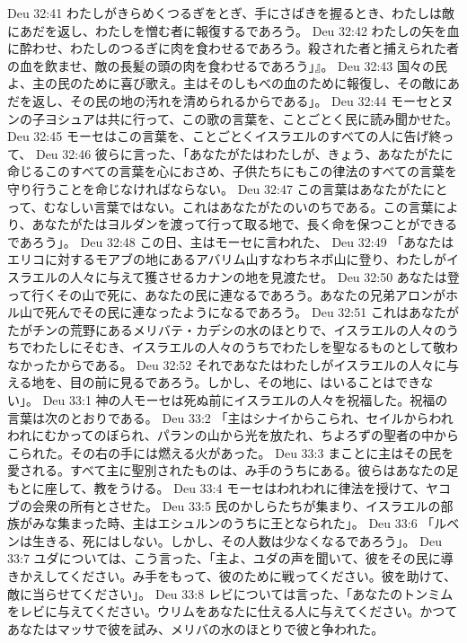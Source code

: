 Deu 32:41  わたしがきらめくつるぎをとぎ、手にさばきを握るとき、わたしは敵にあだを返し、わたしを憎む者に報復するであろう。
Deu 32:42  わたしの矢を血に酔わせ、わたしのつるぎに肉を食わせるであろう。殺された者と捕えられた者の血を飲ませ、敵の長髪の頭の肉を食わせるであろう」』。
Deu 32:43  国々の民よ、主の民のために喜び歌え。主はそのしもべの血のために報復し、その敵にあだを返し、その民の地の汚れを清められるからである」。
Deu 32:44  モーセとヌンの子ヨシュアは共に行って、この歌の言葉を、ことごとく民に読み聞かせた。
Deu 32:45  モーセはこの言葉を、ことごとくイスラエルのすべての人に告げ終って、
Deu 32:46  彼らに言った、「あなたがたはわたしが、きょう、あなたがたに命じるこのすべての言葉を心におさめ、子供たちにもこの律法のすべての言葉を守り行うことを命じなければならない。
Deu 32:47  この言葉はあなたがたにとって、むなしい言葉ではない。これはあなたがたのいのちである。この言葉により、あなたがたはヨルダンを渡って行って取る地で、長く命を保つことができるであろう」。
Deu 32:48  この日、主はモーセに言われた、
Deu 32:49  「あなたはエリコに対するモアブの地にあるアバリム山すなわちネボ山に登り、わたしがイスラエルの人々に与えて獲させるカナンの地を見渡たせ。
Deu 32:50  あなたは登って行くその山で死に、あなたの民に連なるであろう。あなたの兄弟アロンがホル山で死んでその民に連なったようになるであろう。
Deu 32:51  これはあなたがたがチンの荒野にあるメリバテ・カデシの水のほとりで、イスラエルの人々のうちでわたしにそむき、イスラエルの人々のうちでわたしを聖なるものとして敬わなかったからである。
Deu 32:52  それであなたはわたしがイスラエルの人々に与える地を、目の前に見るであろう。しかし、その地に、はいることはできない」。
Deu 33:1  神の人モーセは死ぬ前にイスラエルの人々を祝福した。祝福の言葉は次のとおりである。
Deu 33:2  「主はシナイからこられ、セイルからわれわれにむかってのぼられ、パランの山から光を放たれ、ちよろずの聖者の中からこられた。その右の手には燃える火があった。
Deu 33:3  まことに主はその民を愛される。すべて主に聖別されたものは、み手のうちにある。彼らはあなたの足もとに座して、教をうける。
Deu 33:4  モーセはわれわれに律法を授けて、ヤコブの会衆の所有とさせた。
Deu 33:5  民のかしらたちが集まり、イスラエルの部族がみな集まった時、主はエシュルンのうちに王となられた」。
Deu 33:6  「ルベンは生きる、死にはしない。しかし、その人数は少なくなるであろう」。
Deu 33:7  ユダについては、こう言った、「主よ、ユダの声を聞いて、彼をその民に導きかえしてください。み手をもって、彼のために戦ってください。彼を助けて、敵に当らせてください」。
Deu 33:8  レビについては言った、「あなたのトンミムをレビに与えてください。ウリムをあなたに仕える人に与えてください。かつてあなたはマッサで彼を試み、メリバの水のほとりで彼と争われた。
